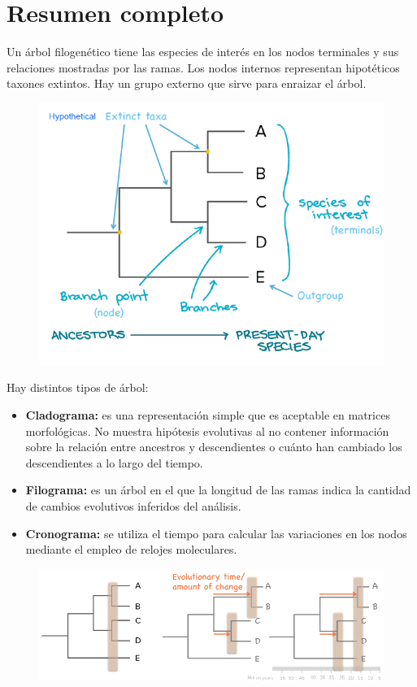 \chapter{Resumen completo}
Un árbol filogenético tiene las especies de interés en los nodos terminales y sus relaciones mostradas por las ramas. Los nodos internos representan hipotéticos taxones extintos. Hay un grupo externo que sirve para enraizar el árbol.

\begin{figure}[htbp]
\centering
\includegraphics[width=0.7\linewidth]{figs/parts-phylotree.png}
\end{figure}

Hay distintos tipos de árbol:
\begin{itemize}
\item \textbf{Cladograma:} es una representación simple que es aceptable en matrices morfológicas. No muestra hipótesis evolutivas al no contener información sobre la relación entre ancestros y descendientes o cuánto han cambiado los descendientes a lo largo del tiempo.
\item \textbf{Filograma:} es un árbol en el que la longitud de las ramas indica la cantidad de cambios evolutivos inferidos del análisis.
\item \textbf{Cronograma:} se utiliza el tiempo para calcular las variaciones en los nodos mediante el empleo de relojes moleculares.
\end{itemize}

\begin{figure}[htbp]
\centering
\includegraphics[width=0.7\linewidth]{figs/tree-types.png}
\end{figure}

